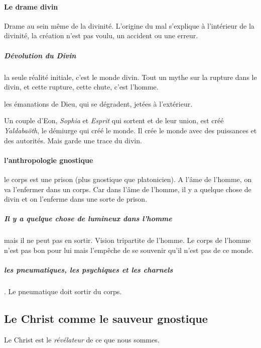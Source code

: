       
      \paragraph{Le drame divin}
      
      Drame au sein même de la divinité. L'origine du mal s'explique à l'intérieur de la divinité, la création n'est pas voulu, un accident ou une erreur. 
      \subparagraph{Dévolution du Divin} la seule réalité initiale, c'est le monde divin. Tout un mythe sur la rupture dans le divin, et cette rupture, cette chute, c'est l'homme.
      
      \begin{Def}[eon]
          les émanations de Dieu, qui se dégradent, jetées à l'extérieur.
      \end{Def}
    Un couple d'Eon, \emph{Sophia} et \emph{Esprit} qui sortent et de leur union, est créé  \emph{Yaldabaöth}, le démiurge qui créé le monde. 
      Il crée le monde avec des puissances et des autorités. Mais garde une trace du divin. 
     \paragraph{l'anthropologie gnostique}
     le corps est une prison (plus gnostique que platonicien). 
     A l'âme de l'homme, on va l'enfermer dans un corps. Car dans l'âme de l'homme, il y a quelque chose de divin et on l'enferme dans une sorte de prison.
     
     \subparagraph{Il y a quelque chose de lumineux dans l'homme} mais il ne peut pas en sortir. Vision tripartite de l'homme. Le corps de l'homme n'est pas bon pour lui mais l'empêche de se souvenir qu'il n'est pas de ce monde.
     
     \subparagraph{les pneumatiques, les psychiques et les charnels}. Le pneumatique doit sortir du corps.
    
  
    
    \subsection{Le Christ comme le sauveur gnostique}
    
    Le Christ est le \textit{révélateur} de ce que nous sommes. 

